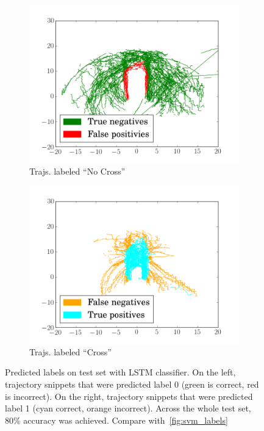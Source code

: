 \begin{figure}
\centering
\begin{subfigure}{.25\textwidth}
  \centering
  \includegraphics[width=.9\linewidth]{figures/rnn_label0}
  \caption{Trajs. labeled ``No Cross''}
  \label{fig:rnn_label0}
\end{subfigure}%
\begin{subfigure}{.25\textwidth}
  \centering
  \includegraphics[width=.9\linewidth]{figures/rnn_label1}
  \caption{Trajs. labeled ``Cross''}
  \label{fig:rnn_label1}
\end{subfigure}
\caption{Predicted labels on test set with LSTM classifier. On the left, trajectory snippets that were predicted label 0 (green is correct, red is incorrect). On the right, trajectory snippets that were predicted label 1 (cyan correct, orange incorrect). Across the whole test set, 80\% accuracy was achieved. Compare with~\cref{fig:svm_labels}}
\label{fig:rnn_labels}
\end{figure}
